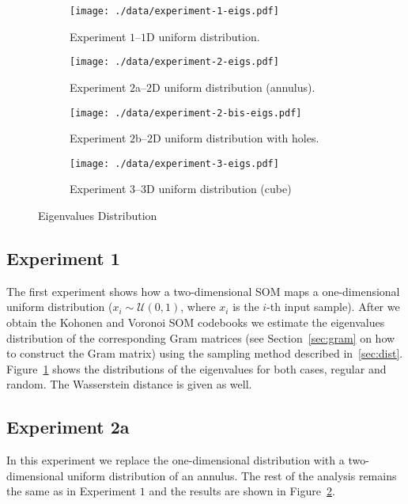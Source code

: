 \documentclass[10pt]{article}
\theoremstyle{definition}
\begin{document}
\begin{figure}[!htpb]
     \begin{subfigure}{0.5\textwidth}
         \centering
         \texttt{[image: ./data/experiment-1-eigs.pdf]}
         \caption{Experiment $1$--$1$D uniform distribution.}%
         \label{Fig:eigs_exp1}
     \end{subfigure}
     \begin{subfigure}{0.5\textwidth}
         \centering
         \texttt{[image: ./data/experiment-2-eigs.pdf]}
         \caption{Experiment $2$a--$2$D uniform distribution (annulus).}%
         \label{Fig:eigs_exp2a}
     \end{subfigure}
     \newline 
     \begin{subfigure}{0.5\textwidth}
         \centering
         \texttt{[image: ./data/experiment-2-bis-eigs.pdf]}
         \caption{Experiment $2$b--$2$D uniform distribution with holes.}%
         \label{Fig:eigs_exp2b}
     \end{subfigure}
     \begin{subfigure}{0.5\textwidth}
         \centering
         \texttt{[image: ./data/experiment-3-eigs.pdf]}
         \caption{Experiment $3$--$3$D uniform distribution (cube)}%
         \label{Fig:eigs_exp3}
     \end{subfigure}
    \caption{Eigenvalues Distribution}%
    \label{fig:distributions}
\end{figure}


\subsection{Experiment 1}
The first experiment shows how a two-dimensional SOM maps a one-dimensional
uniform distribution ($x_i \sim \mathcal{U}(0, 1)$, where $x_i$ is the $i$-th
input sample). After we obtain the Kohonen and Voronoi SOM codebooks we
estimate the eigenvalues distribution of the corresponding Gram matrices (see
Section~\ref{sec:gram} on how to construct the Gram matrix) using the sampling
method described in~\ref{sec:dist}. Figure~\ref{Fig:eigs_exp1} shows the
distributions of the eigenvalues for both cases, regular and random. The
Wasserstein distance is given as well.


\subsection*{Experiment 2a}
In this experiment we replace the one-dimensional distribution with a
two-dimensional uniform distribution of an annulus. The rest of the analysis 
remains the same as in Experiment $1$ and the results are shown in
Figure~\ref{Fig:eigs_exp2a}.
\end{document}
